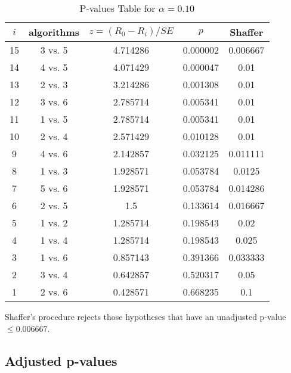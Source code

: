 \documentclass[a4paper,10pt]{article}
\begin{document}
\begin{landscape}
\begin{table}[!htp]
\centering\scriptsize
\begin{tabular}{ccccc}
$i$&algorithms&$z=(R_0 - R_i)/SE$&$p$&Shaffer\\
\hline15&3 vs. 5&4.714286&0.000002&0.006667\\
14&4 vs. 5&4.071429&0.000047&0.01\\
13&2 vs. 3&3.214286&0.001308&0.01\\
12&3 vs. 6&2.785714&0.005341&0.01\\
11&1 vs. 5&2.785714&0.005341&0.01\\
10&2 vs. 4&2.571429&0.010128&0.01\\
9&4 vs. 6&2.142857&0.032125&0.011111\\
8&1 vs. 3&1.928571&0.053784&0.0125\\
7&5 vs. 6&1.928571&0.053784&0.014286\\
6&2 vs. 5&1.5&0.133614&0.016667\\
5&1 vs. 2&1.285714&0.198543&0.02\\
4&1 vs. 4&1.285714&0.198543&0.025\\
3&1 vs. 6&0.857143&0.391366&0.033333\\
2&3 vs. 4&0.642857&0.520317&0.05\\
1&2 vs. 6&0.428571&0.668235&0.1\\
\hline
\end{tabular}
\caption{P-values Table for $\alpha=0.10$}
\end{table}Shaffer's procedure rejects those hypotheses that have an unadjusted p-value $\le0.006667$.

\pagebreak

\subsection{Adjusted p-values}


\end{landscape}
\end{document}
